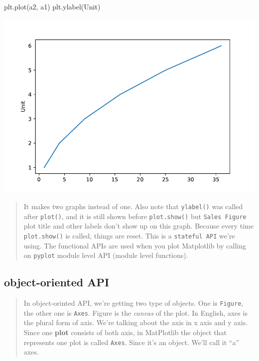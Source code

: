 \documentclass[
]{book}
\newenvironment{Shaded}{\begin{snugshade}}{\end{snugshade}}
\newcommand{\NormalTok}[1]{#1}
\newcommand{\StringTok}[1]{\textcolor[rgb]{0.31,0.60,0.02}{#1}}
\theoremstyle{definition}
\theoremstyle{definition}
\theoremstyle{definition}
\theoremstyle{definition}
\theoremstyle{remark}
\begin{document}
\begin{Shaded}
\begin{Highlighting}[]
\NormalTok{plt.plot(a2, a1)}
\NormalTok{plt.ylabel(}\StringTok{\textquotesingle{}Unit\textquotesingle{}}\NormalTok{)}
\end{Highlighting}
\end{Shaded}

\includegraphics{202403181222-MatPlotLib_files/figure-latex/unnamed-chunk-10-9.pdf}

\begin{quote}
It makes two graphs instead of one. Also note that \texttt{ylabel()} was called after \texttt{plot()}, and it is still shown before \texttt{plot.show()} but \texttt{Sales\ Figure} plot title and other labels don't show up on this graph. Because every time \texttt{plot.show()} is called, things are reset. This is a \texttt{stateful\ API} we're using.
The functional APIs are used when you plot Matplotlib by calling on \texttt{pyplot} module level API (module level functions).
\end{quote}

\subsection{object-oriented API}\label{ooapi}

\begin{quote}
In object-orinted API, we're getting two type of objects. One is \texttt{Figure}, the other one is \texttt{Axes}. Figure is the \emph{canvas} of the plot. In English, axes is the plural form of axis. We're talking about the axis in x axis and y axis. Since one \textbf{plot} consists of both axis, in MatPlotlib the object that represents one plot is called \texttt{Axes}. Since it's an object. We'll call it ``a'' axes.
\end{quote}
\end{document}
